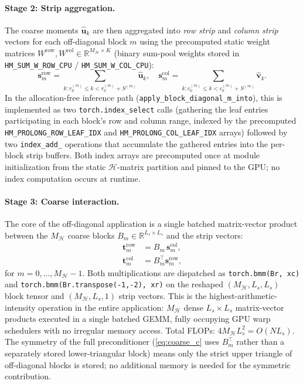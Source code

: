 \documentclass[acmtog,anonymous,review]{acmart}
\begin{document}
\paragraph{Stage 2: Strip aggregation.}
The coarse moments $\hat{\mathbf{u}}_k$ are then aggregated into \emph{row strip} and
\emph{column strip} vectors for each off-diagonal block $m$ using the precomputed static weight
matrices $W^\mathrm{row}, W^\mathrm{col} \in \mathbb{R}^{M_\mathcal{H} \times K}$ (binary
sum-pool weights stored in \texttt{HM\_SUM\_W\_ROW\_CPU} / \texttt{HM\_SUM\_W\_COL\_CPU}):
\begin{equation}
  \mathbf{s}^\mathrm{row}_m = \sum_{k: r_0^{(m)} \leq k < r_0^{(m)} + S^{(m)}} \hat{\mathbf{u}}_k, \quad
  \mathbf{s}^\mathrm{col}_m = \sum_{k: c_0^{(m)} \leq k < c_0^{(m)} + S^{(m)}} \hat{\mathbf{v}}_k.
  \label{eq:strip_agg}
\end{equation}
In the allocation-free inference path (\texttt{apply\_block\_diagonal\_m\_into}), this is
implemented as two \texttt{torch.index\_select} calls (gathering the leaf entries participating in
each block's row and column range, indexed by the precomputed \texttt{HM\_PROLONG\_ROW\_LEAF\_IDX}
and \texttt{HM\_PROLONG\_COL\_LEAF\_IDX} arrays) followed by two \texttt{index\_add\_} operations
that accumulate the gathered entries into the per-block strip buffers.  Both index arrays are
precomputed once at module initialization from the static $\mathcal{H}$-matrix partition and
pinned to the GPU; no index computation occurs at runtime.

\paragraph{Stage 3: Coarse interaction.}
The core of the off-diagonal application is a single batched matrix-vector product between the
$M_\mathcal{H}$ coarse blocks $B_m \in \mathbb{R}^{L_s \times L_s}$ and the strip vectors:
\begin{align}
  \mathbf{t}^\mathrm{row}_m &= B_m \, \mathbf{s}^\mathrm{col}_m, \label{eq:coarse_r}\\
  \mathbf{t}^\mathrm{col}_m &= B_m^\top \mathbf{s}^\mathrm{row}_m, \label{eq:coarse_c}
\end{align}
for $m = 0, \ldots, M_\mathcal{H}-1$.  Both multiplications are dispatched as
\texttt{torch.bmm(Br, xc)} and \texttt{torch.bmm(Br.transpose(-1,-2), xr)} on the reshaped
$(M_\mathcal{H}, L_s, L_s)$ block tensor and $(M_\mathcal{H}, L_s, 1)$ strip vectors.
This is the highest-arithmetic-intensity operation in the entire application: $M_\mathcal{H}$
dense $L_s \times L_s$ matrix-vector products executed in a single batched GEMM, fully occupying
GPU warp schedulers with no irregular memory access.  Total FLOPs: $4 M_\mathcal{H} L_s^2 =
O(N L_s)$.  The symmetry of the full preconditioner (\eqref{eq:coarse_c} uses
$B_m^\top$ rather than a separately stored lower-triangular block) means only the strict upper
triangle of off-diagonal blocks is stored; no additional memory is needed for the symmetric
contribution.
\end{document}
